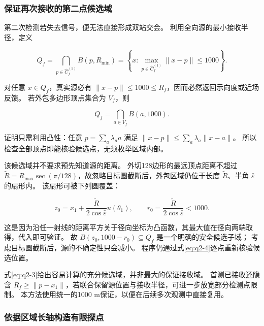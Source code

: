 \documentclass[UTF8,a4paper,zihao=5,fontset=fandol]{ctexart}
\begin{document}
\subsubsection{保证再次接收的第二点候选域}\label{sec:q2-2}

第二次检测若失去信号，便无法直接形成双站交会。
利用全向源的最小接收半径，定义

\begin{equation}\label{eq:q2-3}
Q_f=\bigcap_{p\in\widehat C_f^{(1)}}B(p,R_{\min})
=\left\{x:\max_{p\in\widehat C_f^{(1)}}\|x-p\|\le1000\right\}.
\end{equation}

对任意 \(x\in Q_f\)，真实源必有 \(\|x-p\|\le1000\le R_f\)，因而必然返回示向度或近场反馈。
若外包多边形顶点集合为 \(V_f\)，则

\begin{equation}\label{eq:q2-4}
Q_f=\bigcap_{a\in V_f}B(a,1000).
\end{equation}

证明只需利用凸性：任意 \(p=\sum_a\lambda_a a\) 满足 \(\|x-p\|\le\sum_a\lambda_a\|x-a\|\)。
所以检查全部顶点即能核验候选点，无须枚举区域内部。

\begin{sloppypar}
该候选域并不要求预先知道源的距离。
外切128边形的最远顶点距离不超过 \(\widetilde R=R_{\max}\sec(\pi/128)\)，故忽略目标圆截断后，外包区域仍位于长度 \(\widetilde R\)、半角 \(\bar\varepsilon\) 的扇形内。
该扇形可被下列圆覆盖：
\end{sloppypar}

\begin{equation}\label{eq:q2-5}
z_0=x_1+\frac{\widetilde R}{2\cos\bar\varepsilon}u(\theta_1),
\qquad r_0=\frac{\widetilde R}{2\cos\bar\varepsilon}<1000.
\end{equation}

这是因为沿任一射线的距离平方关于径向坐标为凸函数，其最大值在径向两端取得，代入即可验证。
故 \(B(z_0,1000-r_0)\subseteq Q_f\) 是一个明确的安全候选子域；
考虑目标圆截断后，源的不确定性只会减小。
程序仍通过式\eqref{eq:q2-4}逐点重新核验候选位置。

式\eqref{eq:q2-3}给出容易计算的充分候选域，并非最大的保证接收域。
首测已接收还隐含 \(R_f\ge\|p-x_1\|\)，若联合保留源位置与接收半径，可进一步放宽部分检测点限制。
本方法使用统一的1000 m保证，以便在后续多次观测中直接复用。

\subsubsection{依据区域长轴构造有限探点}\label{sec:q2-3}
\end{document}
